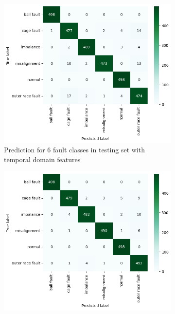 \begin{figure}[ht]
    \centering
    \begin{subfigure}[b]{0.49\textwidth}
        \includegraphics[width=\textwidth]{assets/design/KNN-temporal-confusion-matrix-fault.png}
        \caption{Prediction for 6 fault classes in testing set with temporal domain features}
    \end{subfigure}
    \hfill
    \begin{subfigure}[b]{0.49\textwidth}
        \includegraphics[width=\textwidth]{assets/design/KNN-spectral-confusion-matrix-fault.png}

\end{subfigure}
\end{figure}
